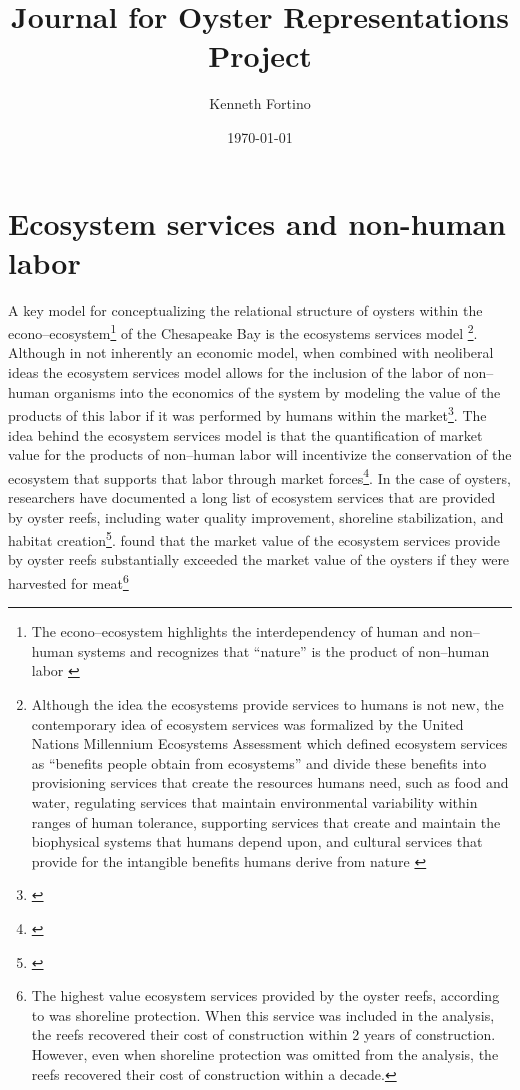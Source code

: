 \documentclass{article}
\begin{document}
\title{Journal for Oyster Representations Project}
\author{Kenneth Fortino}
\date{\today}

\maketitle

\section{Ecosystem services and non-human labor}

A key model for conceptualizing the relational structure of oysters within the econo--ecosystem\footnote{The econo--ecosystem highlights the interdependency of human and non--human systems and recognizes that ``nature'' is the product of non--human labor \cite{gibson-graham_non-human_2020}} of the Chesapeake Bay is the ecosystems services model
\footnote{Although the idea the ecosystems provide services to humans is not new, the contemporary idea of ecosystem services was formalized by the United Nations Millennium Ecosystems Assessment which defined ecosystem services as ``benefits people obtain from ecosystems'' and divide these benefits into provisioning services that create the resources humans need, such as food and water, regulating services that maintain environmental variability within ranges of human tolerance, supporting services that create and maintain the biophysical systems that humans depend upon, and cultural services that provide for the intangible benefits humans derive from nature \cite{reid_millennium_2005}}. 
Although in not inherently an economic model, when combined with neoliberal ideas the ecosystem services model allows for the inclusion of the labor of non--human organisms into the economics of the system by modeling the value of the products of this labor if it was performed by humans within the market\footnote{\cite{costanza_value_1998}}. The idea behind the ecosystem services model is that the quantification of market value for the products of non--human labor will incentivize the conservation of the ecosystem that supports that labor  through market forces\footnote{\cite{costanza_value_1998}}. In the case of oysters, researchers have documented a long list of ecosystem services that are provided by oyster reefs, including water quality improvement, shoreline stabilization, and habitat creation\footnote{\cite{grabowski_economic_2012, coen_oyster_date}}. \citeauthor{grabowski_economic_2012} found that the market value of the ecosystem services provide by oyster reefs substantially exceeded the market value of the oysters if they were harvested for meat\footnote{The highest value ecosystem services  provided by the oyster reefs, according to \cite{grabowski_economic_2012} was shoreline protection. When this service was included in the analysis, the reefs recovered their cost of construction within 2 years of construction. However, even when shoreline protection was omitted from the analysis, the reefs recovered their cost of construction within a decade.} 
\end{document}
